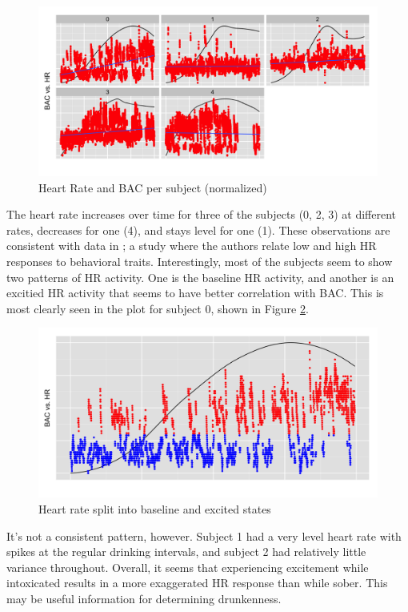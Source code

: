 \begin{figure}
	\includegraphics[width=1.0\textwidth]{../figs/heart_rates}
	\caption{Heart Rate and BAC per subject (normalized)}
	\label{fig:heart_rate_facet}
\end{figure}

The heart rate increases over time for three of the subjects (0, 2, 3) at different rates, decreases for one (4), and stays level for one (1). These observations are consistent with data in \cite{Assaad:2006}; a study where the authors relate low and high HR responses to behavioral traits. Interestingly, most of the subjects seem to show two patterns of HR activity. One is the baseline HR activity, and another is an excitied HR activity that seems to have better correlation with BAC. This is most clearly seen in the plot for subject 0, shown in Figure \ref{fig:heart_rate_split}. \begin{figure}
	\includegraphics[width=1.0\textwidth]{../figs/heart_rate_split}
	\caption{Heart rate split into baseline and excited states}
	\label{fig:heart_rate_split}
\end{figure}It's not a consistent pattern, however. Subject 1 had a very level heart rate with spikes at the regular drinking intervals, and subject 2 had relatively little variance throughout. Overall, it seems that experiencing excitement while intoxicated results in a more exaggerated HR response than while sober. This may be useful information for determining drunkenness.

